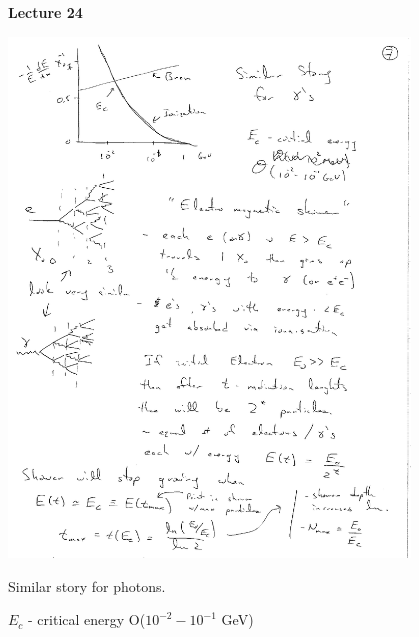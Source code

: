



\thispagestyle{fancy}

\begin{center}
{\huge \textbf{Lecture 24}}
\end{center}

{\fontsize{14}{16}\selectfont

\bc
\includegraphics[width=0.8\textwidth]{./DeDxRadiation.pdf}
\ec

Similar story for photons. 

$E_c$ - critical energy O($10^{-2} - 10^{-1}$ GeV)

}
